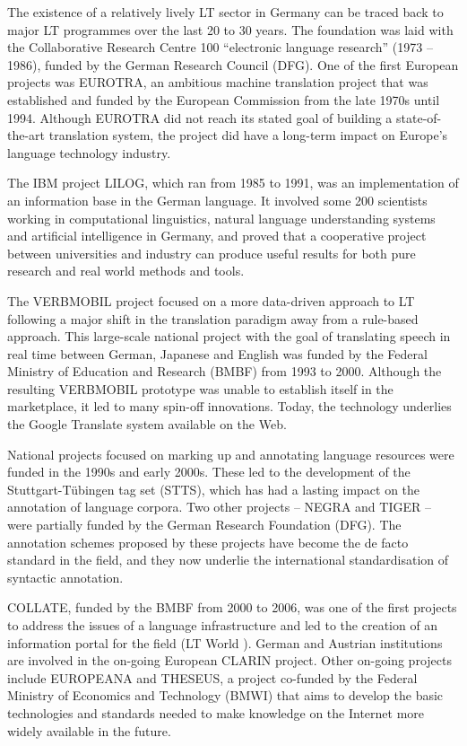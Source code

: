 \begin{multicols}{2}
The existence of a relatively lively LT sector in Germany can be traced back to major LT programmes over the last 20 to 30 years. 
The foundation was laid with the Collaborative Research Centre 100 ``electronic language research'' (1973 -- 1986), funded by the German Research Council (DFG).
One of the first European projects was EUROTRA, an ambitious machine translation project that was established and funded by the European Commission from the late 1970s until 1994. Although EUROTRA did not  reach its stated goal of building a state-of-the-art translation system, the project did have a long-term impact on Europe’s language technology industry. 

 The IBM project LILOG, which ran from 1985 to 1991, was an implementation of an information base in the German language. It involved some 200 scientists working in computational linguistics, natural language understanding systems and artificial intelligence in Germany, and proved that a cooperative project between universities and industry can produce useful results for both pure research and real world methods and tools.

The VERBMOBIL project focused on a more data-driven approach to LT following a major shift in the translation paradigm away from a rule-based approach. This large-scale national project with the goal of translating speech in real time between German, Japanese and English was funded by the Federal Ministry of Education and Research (BMBF) from 1993 to 2000. Although the resulting VERBMOBIL prototype was unable to establish itself in the marketplace, it led to many spin-off innovations. Today, the technology underlies the Google Translate system available on the Web. 

National projects focused on marking up and annotating language resources were funded in the 1990s and early 2000s. These led to the development of the Stuttgart-Tübingen tag set (STTS), which has had a lasting impact on the annotation of language corpora. Two other projects -- NEGRA and TIGER -- were partially funded by the German Research Foundation (DFG). The annotation schemes proposed by these projects have become the de facto standard in the field, and they now underlie the international standardisation of syntactic annotation.

COLLATE, funded by the BMBF from 2000 to 2006, was one of the first projects to address the issues of a language infrastructure and led to the creation of an information portal for the field (LT World \cite{lt-world1}). German and Austrian institutions are involved in the on-going European CLARIN project. Other on-going projects include EUROPEANA and THESEUS, a project co-funded by the Federal Ministry of Economics and Technology (BMWI) that aims to develop the basic technologies and standards needed to make knowledge on the Internet more widely available in the future.


\end{multicols}
